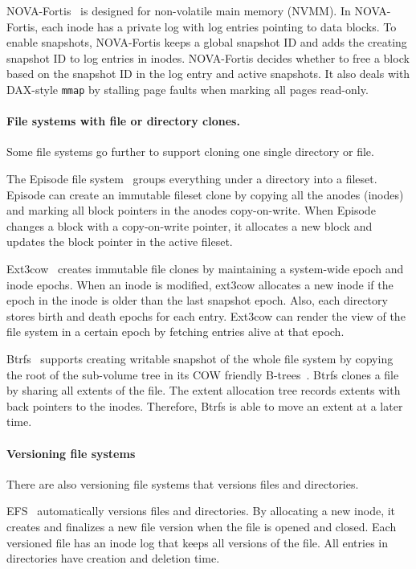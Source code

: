 NOVA-Fortis~\citep{nova} is designed for non-volatile main memory (NVMM).
In NOVA-Fortis, each inode has a private log with log entries pointing
to data blocks.
To enable snapshots, NOVA-Fortis keeps a global snapshot ID and adds the
creating snapshot ID to log entries in inodes.
NOVA-Fortis decides whether to free a block based on the snapshot ID in the log
entry and active snapshots.
It also deals with DAX-style \texttt{mmap} by stalling page faults when marking
all pages read-only.

\paragraph{File systems with file or directory clones.}

Some file systems go further to support cloning one single directory or file.

The Episode file system~\citep{episode} groups everything under a directory into
a fileset.
Episode can create an immutable fileset clone by copying all the anodes (inodes)
and marking all block pointers in the anodes copy-on-write.
When Episode changes a block with a copy-on-write pointer, it allocates a new
block and updates the block pointer in the active fileset.

Ext3cow~\citep{ext3cow} creates immutable file clones by maintaining a
system-wide epoch and inode epochs.
When an inode is modified, ext3cow allocates a new inode if the epoch in the
inode is older than the last snapshot epoch.
Also, each directory stores birth and death epochs for each entry.
Ext3cow can render the view of the file system in a certain epoch by fetching
entries alive at that epoch.

Btrfs~\citep{btrfs} supports creating writable snapshot of the whole file system
by copying the root of the sub-volume tree in its COW friendly
B-trees~\citep{cowbtree}.
Btrfs clones a file by sharing all extents of the file.
The extent allocation tree records extents with back pointers to the inodes.
Therefore, Btrfs is able to move an extent at a later time.

\paragraph{Versioning file systems}

There are also versioning file systems that versions files and directories.

EFS~\citep{efs} automatically versions files and directories.
By allocating a new inode, it creates and finalizes a new file version when the
file is opened and closed.
Each versioned file has an inode log that keeps all versions of the file.
All entries in directories have creation and deletion time.

